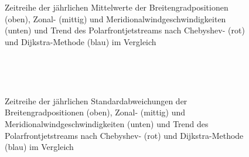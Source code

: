 \begin{figure} %
  \centering
  \begin{minipage}{\textwidth}
    \centering
  \end{minipage} \\ 
    \begin{minipage}{\textwidth}
      \centering
  \end{minipage} \\ 
  \begin{minipage}{\textwidth}
    \centering
  \end{minipage}
  \caption[Zeitreihe der Mittelwerte der Positionen, des Zonal- und Meridionalwinds des Polarfrontjets nach Chebyshev und Dijkstra]{Zeitreihe der jährlichen Mittelwerte der Breitengradpositionen (oben), Zonal- (mittig) und Meridionalwindgeschwindigkeiten (unten) und Trend des Polarfrontjetstreams nach Chebyshev- (rot) und Dijkstra-Methode (blau) im Vergleich} \label{fig:pfj-mean}
\end{figure}

\begin{figure} %
  \centering
  \begin{minipage}{\textwidth}
    \centering
  \end{minipage} \\ 
    \begin{minipage}{\textwidth}
      \centering
  \end{minipage} \\ 
  \begin{minipage}{\textwidth}
    \centering
  \end{minipage}
  \caption[Zeitreihe der Standardabweichungen der Positionen, des Zonal- und Meridionalwinds des Polarfrontjets nach Chebyshev und Dijkstra]{Zeitreihe der jährlichen Standardabweichungen der Breitengradpositionen (oben), Zonal- (mittig) und Meridionalwindgeschwindigkeiten (unten) und Trend des Polarfrontjetstreams nach Chebyshev- (rot) und Dijkstra-Methode (blau) im Vergleich} \label{fig:pfj-sd}
\end{figure}

